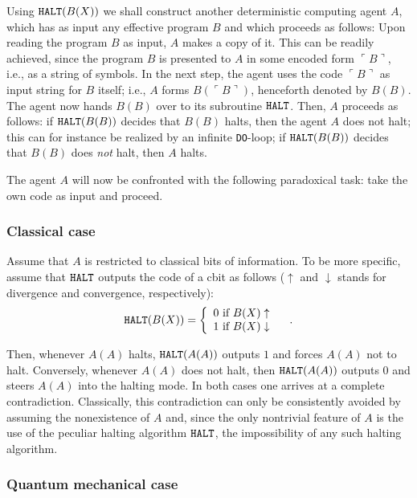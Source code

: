 Using ${\tt HALT}(B(X))$ we shall construct another deterministic
computing agent $A$, which has as input any effective program $B$ and
which proceeds as follows:  Upon reading the program $B$ as input, $A$
makes a copy of it.  This can be readily achieved, since the program $B$
is presented to $A$ in some encoded form
$\ulcorner B\urcorner $,
i.e., as a string of
symbols.  In the next step, the agent uses the code
$\ulcorner B\urcorner $
 as input
string for $B$ itself; i.e., $A$ forms  $B(\ulcorner B\urcorner )$,
henceforth denoted by
$B(B)$.  The agent now hands $B(B)$ over to its subroutine ${\tt HALT}$.
Then, $A$ proceeds as follows:  if ${\tt HALT}(B(B))$ decides that
$B(B)$ halts, then the agent $A$ does not halt; this can for instance be
realized by an infinite {\tt DO}-loop; if ${\tt HALT}(B(B))$ decides
that $B(B)$ does {\em not} halt, then $A$ halts.

The agent $A$ will now be confronted with the following paradoxical
task:  take the own code as input and proceed.

\subsubsection{Classical case}
 Assume that $A$ is
restricted to classical bits of information.
To be more specific,
assume that ${\tt HALT}$ outputs the code of a cbit as follows
($\uparrow$ and $\downarrow$ stands for divergence and convergence,
respectively):
\begin{equation}
{\tt HALT} ( B(X) ) =\left\{
 \begin{array}{l}
0 \mbox{ if } B(X) \uparrow
\\
1 \mbox{ if } B(X) \downarrow \\
\end{array}
 \right.
\quad .
\label{el:halt}
\end{equation}


Then, whenever $A(A)$
halts, ${\tt HALT}(A(A))$ outputs $1$ and forces $A(A)$ not to halt.
Conversely,
whenever $A(A)$ does not halt, then ${\tt HALT}(A(A))$ outputs $0$
and steers
$A(A)$ into the halting mode.  In both cases one arrives at a complete
contradiction.  Classically, this contradiction can only be consistently
avoided by assuming the nonexistence of $A$ and, since the only
nontrivial feature of $A$ is the use of the peculiar halting algorithm
${\tt HALT}$, the impossibility of any such halting algorithm.


\subsubsection{Quantum mechanical case}



